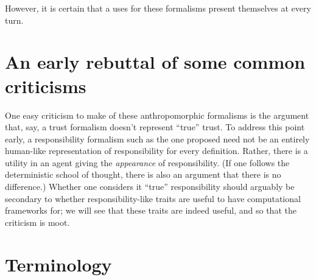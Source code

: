 However, it is certain that a uses for these formalisms present themselves at every turn.\par

\section{An early rebuttal of some common criticisms}

One easy criticism to make of these anthropomorphic formalisms is the argument that, say, a trust formalism doesn't represent ``true'' trust. To address this point early, a responsibility formalism such as the one proposed need not be an entirely human-like representation of responsibility for every definition. Rather, there is a utility in an agent giving the \emph{appearance} of responsibility. (If one follows the deterministic school of thought, there is also an argument that there is no difference\cite{determinism_in_brief}.) Whether one considers it ``true'' responsibility should arguably be secondary to whether responsibility-like traits are useful to have computational frameworks for; we will see that these traits are indeed useful, and so that the criticism is moot.\par

\section{Terminology}\label{subsec:terminology}
